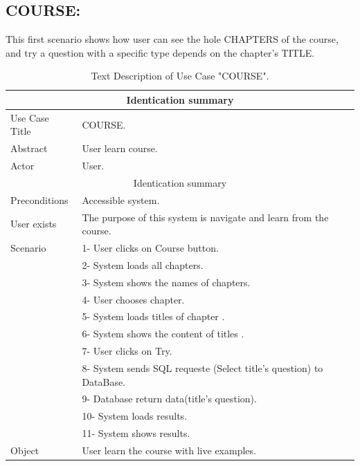 \subsection{COURSE:}
This first scenario shows how user can see the hole CHAPTERS of the course, and try  a question with a specific type depends on the chapter's TITLE.

\newpage

\begin{table}[h!]
	\begin{center}
		\begin{tabular}{ |p{3cm}|p{9cm}|  }
 		\hline
 		\multicolumn{2}{|c|}{Identication summary} \\
 		\hline
 		Use Case Title & COURSE. \\
 		\hline
 		Abstract   & User learn course. \\
		\hline
 		Actor&  User. \\
		\hline
		\multicolumn{2}{|c|}{Identication summary} \\
		\hline
		Preconditions & Accessible system.  \\
		\hline
		User exists    &  The purpose of this system is navigate and learn from the course. \\
		\hline
		Scenario &  1- User clicks on Course button. \\ & 2- System loads all chapters. \\ & 3- System shows the names of chapters. \\ & 4- User chooses chapter. \\ & 5- System loads titles of chapter . \\ & 6- System shows the content of titles . \\ & 7- User clicks on Try. \\ & 8- System sends SQL requeste (Select title's question) to DataBase.\\ & 9- Database return data(title's question).\\ & 10- System loads results.\\ & 11- System shows results.\\
		\hline
		Object& User learn the course with live examples.   \\
 		\hline
\end{tabular}
\end{center}
\caption{Text Description of Use Case "COURSE".}
\label{tab:DS COURSE}
\end{table}



